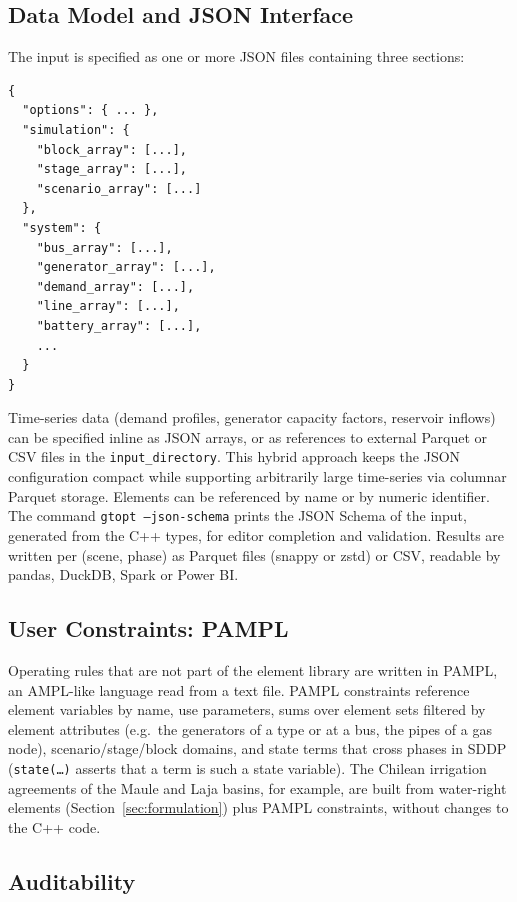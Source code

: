\subsection{Data Model and JSON Interface}

The input is specified as one or more JSON files containing three sections:

\begin{lstlisting}[language={},caption={Top-level JSON structure}]
{
  "options": { ... },
  "simulation": {
    "block_array": [...],
    "stage_array": [...],
    "scenario_array": [...]
  },
  "system": {
    "bus_array": [...],
    "generator_array": [...],
    "demand_array": [...],
    "line_array": [...],
    "battery_array": [...],
    ...
  }
}
\end{lstlisting}

Time-series data (demand profiles, generator capacity factors, reservoir
inflows) can be specified inline as JSON arrays, or as references to
external Parquet or CSV files in the \texttt{input\_directory}.  This
hybrid approach keeps the JSON configuration compact while supporting
arbitrarily large time-series via columnar Parquet storage.  Elements
can be referenced by name or by numeric identifier.  The command
\texttt{gtopt --json-schema} prints the JSON Schema of the input,
generated from the C++ types, for editor completion and validation.
Results are written per (scene, phase) as Parquet files (snappy or zstd)
or CSV, readable by pandas, DuckDB, Spark or Power BI.

\subsection{User Constraints: PAMPL}

Operating rules that are not part of the element library are written in
PAMPL, an AMPL-like language read from a text file.  PAMPL constraints
reference element variables by name, use parameters, sums over element
sets filtered by element attributes (e.g.\ the generators of a type or
at a bus, the pipes of a gas node), scenario/stage/block domains, and
state terms that cross phases in SDDP (\texttt{state(\dots)} asserts
that a term is such a state variable).  The Chilean irrigation agreements of the Maule
and Laja basins, for example, are built from water-right elements
(Section~\ref{sec:formulation}) plus PAMPL constraints, without changes
to the C++ code.

\subsection{Auditability}

